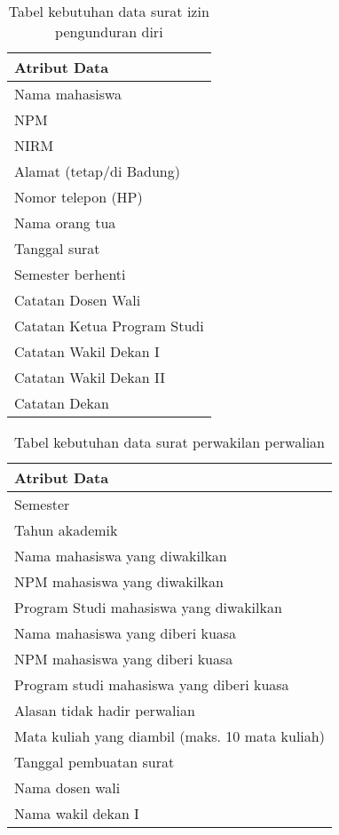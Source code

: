 \begin{table}[H]
\centering
\caption{Tabel kebutuhan data surat izin pengunduran diri}
\label{surat_izin_pengunduran_diri}
\begin{tabular}{|l|}
\hline
\textbf{Atribut Data}                     \\ \hline
Nama mahasiswa                            \\ \hline 
NPM                                       \\ \hline 
NIRM                                      \\ \hline 
Alamat (tetap/di Badung)                  \\ \hline 
Nomor telepon (HP)                        \\ \hline 
Nama orang tua                            \\ \hline 
Tanggal surat                             \\ \hline 
Semester berhenti                         \\ \hline 
Catatan Dosen Wali                        \\ \hline 
Catatan Ketua Program Studi               \\ \hline 
Catatan Wakil Dekan I                     \\ \hline 
Catatan Wakil Dekan II                    \\ \hline 
Catatan Dekan                             \\ \hline
\end{tabular}
\end{table}

\begin{table}[H]
\centering
\caption{Tabel kebutuhan data surat perwakilan perwalian}
\label{surat_perwakilan_perwalian}
\begin{tabular}{|l|}
\hline
\textbf{Atribut Data}                      \\ \hline
Semester            					   \\ \hline
Tahun akademik							   \\ \hline
Nama mahasiswa yang diwakilkan             \\ \hline 
NPM mahasiswa yang diwakilkan              \\ \hline 
Program Studi mahasiswa yang diwakilkan    \\ \hline 
Nama mahasiswa yang diberi kuasa           \\ \hline 
NPM mahasiswa yang diberi kuasa            \\ \hline 
Program studi mahasiswa yang diberi kuasa  \\ \hline 
Alasan tidak hadir perwalian               \\ \hline 
Mata kuliah yang diambil (maks. 10 mata kuliah)                  \\ \hline 
Tanggal pembuatan surat                    \\ \hline
Nama dosen wali							   \\ \hline
Nama wakil dekan I						   \\ \hline
\end{tabular}
\end{table}

